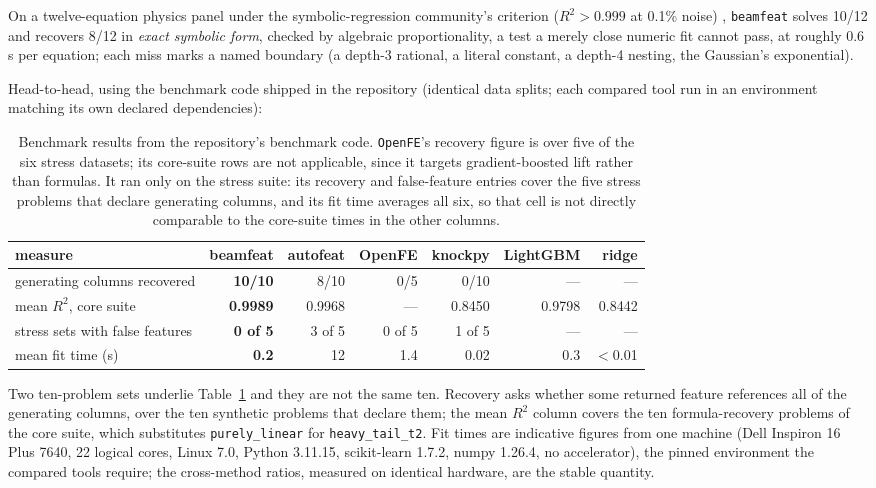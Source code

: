 \documentclass[
]{article}
\begin{document}
On a twelve-equation physics panel under the symbolic-regression
community's criterion (\(R^2 > 0.999\) at 0.1\% noise)
\citep{lacava2021, udrescu2020}, \texttt{beamfeat} solves 10/12 and
recovers 8/12 in \emph{exact symbolic form}, checked by algebraic
proportionality, a test a merely close numeric fit cannot pass, at
roughly 0.6 s per equation; each miss marks a named boundary (a depth-3
rational, a literal constant, a depth-4 nesting, the Gaussian's
exponential).

Head-to-head, using the benchmark code shipped in the repository
(identical data splits; each compared tool run in an environment
matching its own declared dependencies):

\begin{table}[tbp]
\centering
\small
\caption{Benchmark results from the repository's benchmark code.
\texttt{OpenFE}'s recovery figure is over five of the six stress datasets; its
core-suite rows are not applicable, since it targets gradient-boosted lift
rather than formulas. It ran only on the stress suite: its recovery and
false-feature entries cover the five stress problems that declare generating
columns, and its fit time averages all six, so that cell is not directly
comparable to the core-suite times in the other columns.}
\label{tab:headtohead}
\begin{tabular}{@{}lrrrrrr@{}}
\toprule
measure & beamfeat & autofeat & OpenFE & knockpy & LightGBM & ridge \\
\midrule
generating columns recovered & \textbf{10/10} & 8/10 & 0/5 & 0/10 & --- & --- \\
mean $R^2$, core suite & \textbf{0.9989} & 0.9968 & --- & 0.8450 & 0.9798 & 0.8442 \\
stress sets with false features & \textbf{0 of 5} & 3 of 5 & 0 of 5 & 1 of 5 & --- & --- \\
mean fit time (s) & \textbf{0.2} & 12 & 1.4 & 0.02 & 0.3 & $<$0.01 \\
\bottomrule
\end{tabular}
\end{table}

Two ten-problem sets underlie Table~\ref{tab:headtohead} and they are not the
same ten. Recovery asks whether some returned feature references all of the
generating columns, over the ten synthetic problems that declare them; the mean
$R^2$ column covers the ten formula-recovery problems of the core suite, which
substitutes \texttt{purely\_linear} for \texttt{heavy\_tail\_t2}. Fit times are
indicative figures from one machine (Dell Inspiron 16 Plus 7640, 22 logical
cores, Linux 7.0, Python 3.11.15, scikit-learn 1.7.2, numpy 1.26.4, no
accelerator), the pinned environment the compared tools require; the
cross-method ratios, measured on identical hardware, are the stable quantity.
\end{document}
